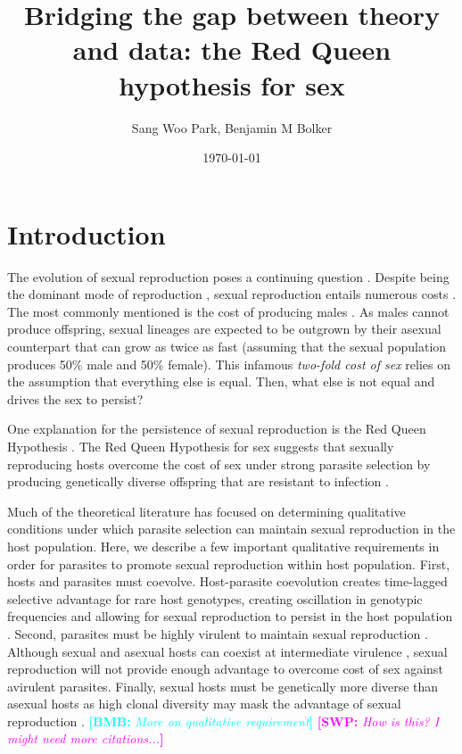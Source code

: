 \documentclass{article}\usepackage[]{graphicx}\usepackage[]{color}
\title{Bridging the gap between theory and data: the Red Queen hypothesis for sex}
\author{Sang Woo Park, Benjamin M Bolker}
\date{\today}
\newcommand{\comment}[3]{\textcolor{#1}{\textbf{[#2: }\textit{#3}\textbf{]}}}
\newcommand{\bmb}[1]{\comment{cyan}{BMB}{#1}}
\newcommand{\swp}[1]{\comment{magenta}{SWP}{#1}}
\begin{document}
\maketitle

\section{Introduction}

The evolution of sexual reproduction poses a continuing question \citep{otto2009evolutionary}.
Despite being the dominant mode of reproduction \citep{vrijenhoek1998animal}, sexual reproduction entails numerous costs \citep{lehtonen2012many}.
The most commonly mentioned is the cost of producing males \citep{smith1978evolution}.
As males cannot produce offspring, sexual lineages are expected to be outgrown by their asexual counterpart that can grow as twice as fast (assuming that the sexual population produces 50\% male and 50\% female).
This infamous \emph{two-fold cost of sex} \citep{smith1978evolution} relies on the assumption that everything else is equal.
Then, what else is not equal and drives the sex to persist?

One explanation for the persistence of sexual reproduction is the Red Queen Hypothesis \citep{bell1982masterpiece}.
The Red Queen Hypothesis for sex suggests that sexually reproducing hosts overcome the cost of sex under strong parasite selection by producing genetically diverse offspring that are resistant to infection \citep{jbs1949disease, jaenike1978hypothesis, hamilton1980sex}.

Much of the theoretical literature has focused on determining qualitative conditions under which parasite selection can maintain sexual reproduction in the host population.
Here, we describe a few important qualitative requirements in order for parasites to promote sexual reproduction within host population.
First, hosts and parasites must coevolve.
Host-parasite coevolution creates time-lagged selective advantage for rare host genotypes, creating oscillation in genotypic frequencies and allowing for sexual reproduction to persist in the host population \citep{clarke1976ecological, hamilton1980sex}.
Second, parasites must be highly virulent to maintain sexual reproduction \citep{may1983epidemiology}.
Although sexual and asexual hosts can coexist at intermediate virulence \citep{howard1994parasitism}, sexual reproduction will not provide enough advantage to overcome cost of sex against avirulent parasites.
Finally, sexual hosts must be genetically more diverse than asexual hosts as high clonal diversity may mask the advantage of sexual reproduction \citep{lively2010review, ashby2015diversity}.
\bmb{More on qualitative requirement}
\swp{How is this? I might need more citations...}
\end{document}
